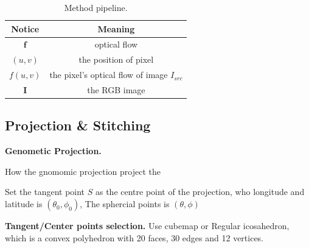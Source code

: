 \begin{table}
	\begin{center}
		\begin{tabular}{ c | c } 
			\hline
			Notice & Meaning  \\ [0.5ex] 
			\hline\hline
			$\textbf{f}$ & optical flow  \\ 
			\hline
			$(u,v)$ & the position of pixel   \\
			\hline
			$f(u,v)$ & the pixel's optical flow of image $I_{src}$ \\
			\hline
			$\textbf{I}$ & the RGB image  \\ [1ex] 
			\hline
		\end{tabular}
	\end{center}
	\caption{Method pipeline. }
	\label{tab:approach:notation}
\end{table}

\subsection{Projection \& Stitching}

\textbf{Genometic Projection.}

How the gnomomic projection project the 

Set the tangent point $S$ as the centre point of the projection, who longitude and latitude is $(\theta_0, \phi_0)$,
The sphercial points is $(\theta, \phi)$



\textbf{Tangent/Center points selection.}
Use cubemap or Regular icosahedron, which is a convex polyhedron with 20 faces, 30 edges and 12 vertices.

%


